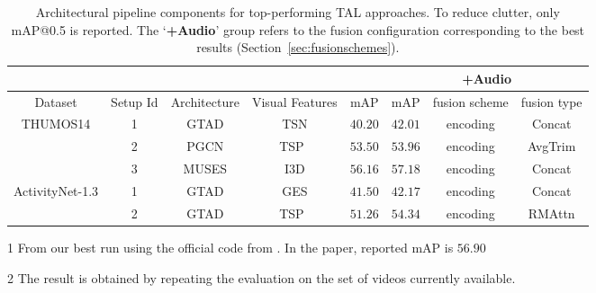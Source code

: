 \documentclass[10pt,twocolumn,letterpaper]{article}
\begin{document}
\begin{table*}[!t]
\centering
\begin{threeparttable}
\resizebox{\linewidth}{!}
{
\centering
\begin{tabular}{c|c|c|c|c|c|c|c}
       & \multicolumn{2}{c|}{ } & \multicolumn{2}{c|}{ } & \multicolumn{3}{c}{\textbf{+Audio}} \\
\toprule
Dataset & Setup Id & Architecture & Visual Features  & mAP & mAP & fusion scheme & fusion type \\
\toprule
\multirow{2}{*}[-0.75em]{\rule{0pt}{2ex} THUMOS14\cite{THUMOS14}}
&  1
&  GTAD\cite{Xu_2020_CVPR} & TSN\cite{8454294} & $40.20$ & $\mathbf{42.01}$ & encoding & Concat  \\
 & 2 & PGCN\cite{PGCN2019ICCV} & TSP~\cite{DBLP:journals/corr/abs-2011-11479} & $53.50$ & $\mathbf{53.96}$ & encoding & AvgTrim \\
 & 3 & MUSES\cite{Liu_2021_CVPR} & I3D\cite{8099985}  & $56.16$\tnote{1} & \cellcolor{SkyBlue}$\mathbf{57.18}$ & encoding & Concat \\
 \midrule
  \multirow{2}{*}[0em]{\rule{0pt}{2ex} ActivityNet-1.3\cite{Heilbron_2015_CVPR}}
  &  1
  & GTAD\cite{Xu_2020_CVPR} & GES\cite{xiong2016cuhk}  & $41.50$\tnote{2} & $\mathbf{42.17}$ & encoding & Concat \\
  &  2
  & GTAD\cite{Xu_2020_CVPR} & TSP~\cite{DBLP:journals/corr/abs-2011-11479} & $51.26$ & \cellcolor{SkyBlue}$\mathbf{54.34}$ & encoding & RMAttn \\
 \bottomrule
\end{tabular}
}

\caption{Architectural pipeline components for top-performing TAL approaches. To reduce clutter, only mAP@0.5 is reported. The `\textbf{+Audio}' group refers to the fusion configuration corresponding to the best results (Section~\ref{sec:fusionschemes}).}
\begin{tablenotes}\scriptsize
 \item[1] From our best run using the official code from \cite{Liu_2021_CVPR}. In the paper, reported mAP is $56.90$
 \item[2] The result is obtained by repeating the evaluation on the set of videos currently available.
\end{tablenotes}
\label{tab:archsetup}
\end{threeparttable}
\end{table*}
\end{document}
